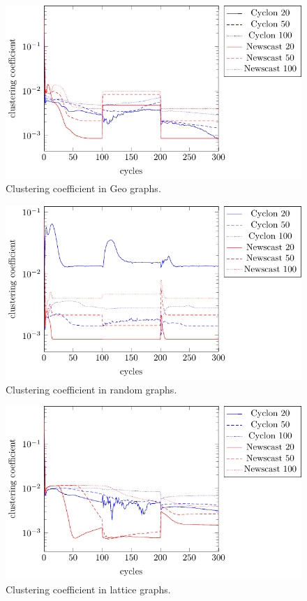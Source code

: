 \documentclass[a4paper]{ifacconf}
\begin{document}
\begin{figure}[p]
    \centering
    \includegraphics[width=.9\linewidth]{"figures/clustering_coefficient/clustering coefficient geo"}
    \caption{Clustering coefficient in Geo graphs.}
    \label{fig:clustering-coefficient-geo}
\end{figure}
\begin{figure}[p]
    \centering
    \includegraphics[width=.9\linewidth]{"figures/clustering_coefficient/clustering coefficient random"}
    \caption{Clustering coefficient in random graphs.}
    \label{fig:clustering-coefficient-random}
\end{figure}
\begin{figure}[p]
    \centering
    \includegraphics[width=.9\linewidth]{"figures/clustering_coefficient/clustering coefficient lattice"}
    \caption{Clustering coefficient in lattice graphs.}
    \label{fig:clustering-coefficient-lattice}
\end{figure}
\end{document}
